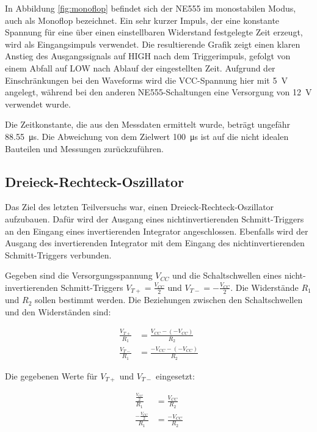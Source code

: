 In Abbildung \ref{fig:monoflop} befindet sich der NE555 im monostabilen Modus, auch als Monoflop bezeichnet. Ein sehr kurzer Impuls, der eine konstante Spannung für eine über einen einstellbaren Widerstand festgelegte Zeit erzeugt, wird als Eingangsimpuls verwendet. Die resultierende Grafik zeigt einen klaren Anstieg des Ausgangssignals auf HIGH nach dem Triggerimpuls, gefolgt von einem Abfall auf LOW nach Ablauf der eingestellten Zeit. Aufgrund der Einschränkungen bei den Waveforms wird die VCC-Spannung hier mit \SI{5}{\volt} angelegt, während bei den anderen NE555-Schaltungen eine Versorgung von \SI{12}{\volt} verwendet wurde.

Die Zeitkonstante, die aus den Messdaten ermittelt wurde, beträgt ungefähr \SI{88,55}{\micro\second}. Die Abweichung von dem Zielwert \SI{100}{\micro\second} ist auf die nicht idealen Bauteilen und Messungen zurückzuführen.

\subsection{Dreieck-Rechteck-Oszillator}
%
Das Ziel des letzten Teilversuchs war, einen Dreieck-Rechteck-Oszillator aufzubauen. Dafür wird der Ausgang eines nichtinvertierenden Schmitt-Triggers an den Eingang eines invertierenden Integrator angeschlossen. Ebenfalls wird der Ausgang des invertierenden Integrator mit dem Eingang des nichtinvertierenden Schmitt-Triggers  verbunden.

Gegeben sind die Versorgungsspannung \( V_{CC} \) und die Schaltschwellen eines nicht-invertierenden Schmitt-Triggers \( V_{T+} = \frac{V_{CC}}{2} \) und \( V_{T-} = -\frac{V_{CC}}{2} \). Die Widerstände \( R_1 \) und \( R_2 \) sollen bestimmt werden. Die Beziehungen zwischen den Schaltschwellen und den Widerständen sind:

\begin{align}
    \frac{V_{T+}}{R_1} &= \frac{V_{CC} - (-V_{CC})}{R_2} \\
    \frac{V_{T-}}{R_1} &= \frac{-V_{CC} - (-V_{CC})}{R_2}
\end{align}

Die gegebenen Werte für \( V_{T+} \) und \( V_{T-} \) eingesetzt:

\begin{align}
    \frac{\frac{V_{CC}}{2}}{R_1} &= \frac{V_{CC}}{R_2} \\
    \frac{-\frac{V_{CC}}{2}}{R_1} &= \frac{-V_{CC}}{R_2}
\end{align}

